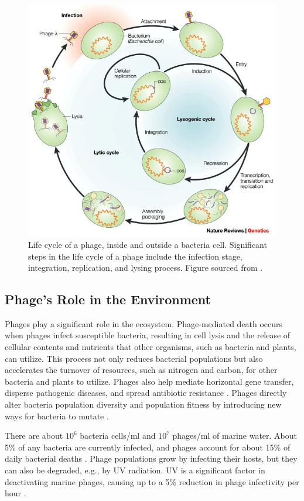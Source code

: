 \begin{figure}
    \centering
    \includegraphics[width=0.5\linewidth]{Figures/phage_life_cycle.png}
    \caption{Life cycle of a phage, inside and outside a bacteria cell. Significant steps in the life cycle of a phage include the infection stage, integration, replication, and lysing process. Figure sourced from \citet{campbellFutureBacteriophageBiology2003}. }
    \label{fig:phage_life_cycle}
\end{figure}

\subsection{Phage’s Role in the Environment}
Phages play a significant role in the ecosystem. 
Phage-mediated death occurs when phages infect susceptible bacteria, resulting in cell lysis and the release of cellular contents and nutrients that other organisms, such as bacteria and plants, can utilize. 
This process not only reduces bacterial populations but also accelerates the turnover of resources, such as nitrogen and carbon, for other bacteria and plants to utilize. 
Phages also help mediate horizontal gene transfer, disperse pathogenic diseases, and spread antibiotic resistance \cite{al-shayebCladesHugePhages2020}. 
Phages directly alter bacteria population diversity and population fitness by introducing new ways for bacteria to mutate \cite{brownEcologicalFunctionalRoles2022}. 

There are about $10^6$ bacteria cells/ml and $10^7$ phages/ml of marine water. 
About 5\% of any bacteria are currently infected, and phages account for about 15\% of daily bacterial deaths \cite{chibani-chennoufiPhageHostInteractionEcological2004}. 
Phage populations grow by infecting their hosts, but they can also be degraded, e.g., by UV radiation. 
UV is a significant factor in deactivating marine phages, causing up to a 5\% reduction in phage infectivity per hour \cite{chibani-chennoufiPhageHostInteractionEcological2004}. 

